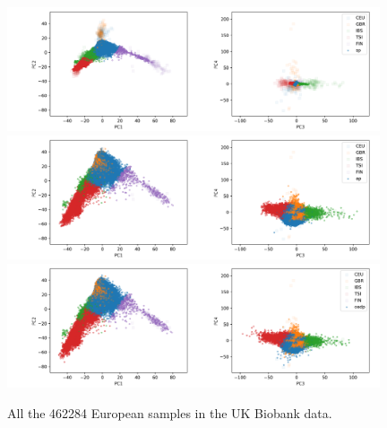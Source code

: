 \documentclass{article}
\begin{document}
\begin{figure}[p]
  \centering
  \includegraphics[width=0.98\textwidth]{img/ukb_snpscap_kgn_bial_orphans_pred_EUR_nchunks100_sturef_kgn_bial_orphans_snps_ukb_snpscap_ukb_EUR_sp.png}
  \includegraphics[width=0.98\textwidth]{img/ukb_snpscap_kgn_bial_orphans_pred_EUR_nchunks100_sturef_kgn_bial_orphans_snps_ukb_snpscap_ukb_EUR_ap.png}
  \includegraphics[width=0.98\textwidth]{img/ukb_snpscap_kgn_bial_orphans_pred_EUR_nchunks100_sturef_kgn_bial_orphans_snps_ukb_snpscap_ukb_EUR_oadp.png}
  \caption{All the 462284 European samples in the UK Biobank data.}
\end{figure}
\end{document}
